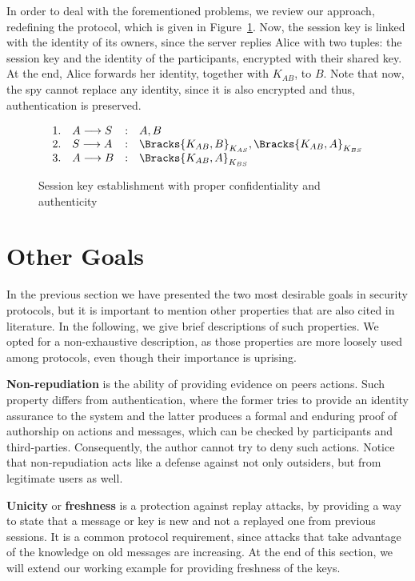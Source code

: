 In order to deal with the forementioned problems, we review our approach, redefining the protocol, which is given in Figure~\ref{prt:session-key-auth}. Now, the session key is linked with the identity of its owners, since the server replies Alice with two tuples: the session key and the identity of the participants, encrypted with their shared key. At the end, Alice forwards her identity, together with \(K_{AB}\), to \(B\). Note that now, the spy cannot replace any identity, since it is also encrypted and thus, authentication is preserved.

\begin{figure}[ht]\label{prt:session-key-auth}
  \centering
  \[
    \begin{array}{rlcl}
      1. & A \longrightarrow S &:& A, B \\
      2. & S \longrightarrow A &:& \Bracks{K_{AB}, B}_{K_{AS}}, \Bracks{K_{AB}, A}_{K_{BS}} \\
      3. & A \longrightarrow B &:& \Bracks{K_{AB}, A}_{K_{BS}} \\
    \end{array}
  \]
  \caption{Session key establishment with proper confidentiality and authenticity}
\end{figure}





\section{Other Goals}
In the previous section we have presented the two most desirable goals in security protocols, but it is important to mention other properties that are also cited in literature. In the following, we give brief descriptions of such properties. We opted for a non-exhaustive description, as those properties are more loosely used among protocols, even though their importance is uprising.

\textbf{Non-repudiation} is the ability of providing evidence on peers actions. Such property differs from authentication, where the former tries to provide an identity assurance to the system and the latter produces a formal and enduring proof of authorship on actions and messages, which can be checked by participants and third-parties. Consequently, the author cannot try to deny such actions. Notice that non-repudiation acts like a defense against not only outsiders, but from legitimate users as well.

\textbf{Unicity} or \textbf{freshness} is a protection against replay attacks, by providing a way to state that a message or key is new and not a replayed one from previous sessions. It is a common protocol requirement, since attacks that take advantage of the knowledge on old messages are increasing. At the end of this section, we will extend our working example for providing freshness of the keys.

